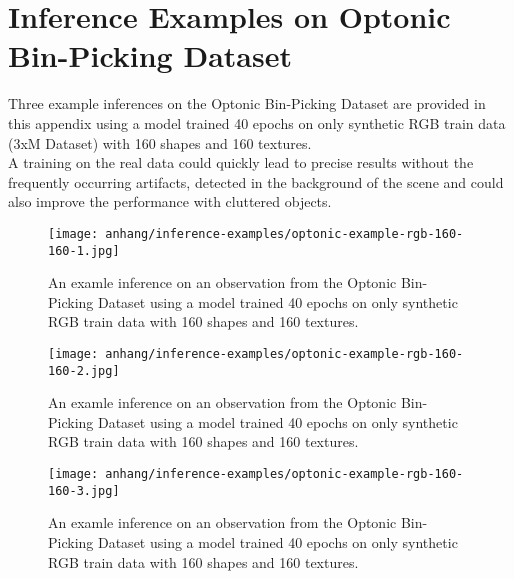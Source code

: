 \chapter{Inference Examples on Optonic Bin-Picking Dataset}
\label{appendix:inference-examples}
	Three example inferences on the Optonic Bin-Picking Dataset are provided in this appendix using a model trained 40 epochs on only synthetic RGB train data (3xM Dataset) with 160 shapes and 160 textures.\\
	A training on the real data could quickly lead to precise results without the frequently occurring artifacts, detected in the background of the scene and could also improve the performance with cluttered objects.

	\begin{figure}[H]
		\centering
		\texttt{[image: anhang/inference-examples/optonic-example-rgb-160-160-1.jpg]}
		\caption[An examle inference on an observation from the Optonic Bin-Picking Dataset using a model trained 40 epochs on only synthetic RGB train data with 160 shapes and 160 textures.]{An examle inference on an observation from the Optonic Bin-Picking Dataset using a model trained 40 epochs on only synthetic RGB train data with 160 shapes and 160 textures.}
	\end{figure}
	
	\begin{figure}[H]
		\centering
		\texttt{[image: anhang/inference-examples/optonic-example-rgb-160-160-2.jpg]}
		\caption[An examle inference on an observation from the Optonic Bin-Picking Dataset using a model trained 40 epochs on only synthetic RGB train data with 160 shapes and 160 textures.]{An examle inference on an observation from the Optonic Bin-Picking Dataset using a model trained 40 epochs on only synthetic RGB train data with 160 shapes and 160 textures.}
	\end{figure}
	
	\begin{figure}[H]
		\centering
		\texttt{[image: anhang/inference-examples/optonic-example-rgb-160-160-3.jpg]}
		\caption[An examle inference on an observation from the Optonic Bin-Picking Dataset using a model trained 40 epochs on only synthetic RGB train data with 160 shapes and 160 textures.]{An examle inference on an observation from the Optonic Bin-Picking Dataset using a model trained 40 epochs on only synthetic RGB train data with 160 shapes and 160 textures.}
	\end{figure}


